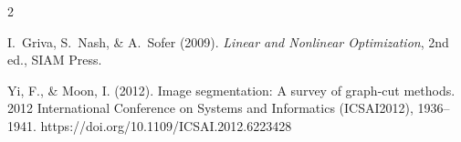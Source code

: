 \documentclass[12pt]{article}
\theoremstyle{homework}
\begin{document}
\begin{thebibliography}{2}  %

  I.~Griva, S.~Nash, \& A.~Sofer (2009).
  \textit{Linear and Nonlinear Optimization},
  2nd ed., SIAM Press.

  Yi, F., \& Moon, I. (2012). 
  Image segmentation: A survey of graph-cut methods. 2012 International Conference on Systems and Informatics (ICSAI2012), 1936–1941. https://doi.org/10.1109/ICSAI.2012.6223428

  \end{thebibliography}
\end{document}
